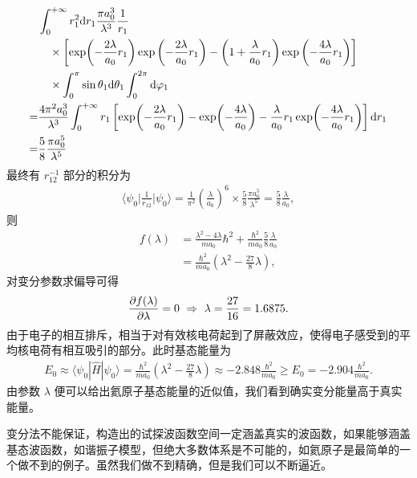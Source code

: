 \begin{align}
    &\int_0^{+\infty} r_1^2 \mathrm{d} r_1 \frac{\pi a_0^3}{\lambda^3} \frac1{r_1}  \notag \\ 
    &\quad\times\left[
        \exp\!\left(-\frac{2\lambda}{a_0}r_1\right)         \exp\left(-\frac{2\lambda}{a_0}r_1\right) - \left(1+\frac{\lambda}{a_0}r_1\right) \exp\left(-\frac{4\lambda}{a_0}r_1\right)
    \right] \notag \\
    &\quad \times \int_0^\pi \sin\theta_1 \mathrm{d}\theta_1
    \int_0^{2\pi} \mathrm{d}\varphi_1 \\
    =& \frac{4\pi^2 a_0^3}{\lambda^3} \int_0^{+\infty} r_1 
    \left[
        \exp\!\left(-\frac{2\lambda}{a_0} r_1\right) - \exp\!\left(-\frac{4\lambda}{a_0}\right) - 
        \frac{\lambda}{a_0} r_1 \exp\!\left(-\frac{4\lambda}{a_0} r_1\right)
    \right] \mathrm{d} r_1 \notag
    \\
    =& \frac58 \frac{\pi a_0^5}{\lambda^5}
\end{align}
最终有 $r_{12}^{-1}$ 部分的积分为
\begin{align}
    \bigg\langle \psi_0 \bigg| \frac1{r_{12}} \bigg| \psi_0 \bigg\rangle = \frac1{\pi^2}\left(\frac{\lambda}{a_0}\right)^6 \times \frac58 \frac{\pi a_0^5}{\lambda^5} = \frac58 \frac{\lambda}{a_0},
\end{align}
则
\begin{align}
    f(\lambda) &= \frac{\lambda^2 - 4\lambda}{ma_0}\hbar^2 + \frac{\hbar^2}{ma_0} \frac58 \frac{\lambda}{a_0} \\
    &= \frac{\hbar^2}{ma_0} \left(\lambda^2 - \frac{27}8 \lambda\right), 
\end{align}
对变分参数求偏导可得
\begin{align}
    \pdv{f(\lambda)}{\lambda} = 0 \ \Rightarrow \ \lambda = \frac{27}{16} = \num{1.6875}.
\end{align}
由于电子的相互排斥，相当于对有效核电荷起到了屏蔽效应，使得电子感受到的平均核电荷有相互吸引的部分。此时基态能量为
\begin{align}
    E_0 \approx \langle \psi_0|\hat H | \psi_0\rangle = \frac{\hbar^2}{ma_0} \left(\lambda^2 - \frac{27}8 \lambda\right) \approx \num{-2.848} \frac{\hbar^2}{ma_0} \geqslant E_0 = \num{-2.904} \frac{\hbar^2}{ma_0}. 
\end{align}
由参数 $\lambda$ 便可以给出氦原子基态能量的近似值，我们看到确实变分能量高于真实能量。

变分法不能保证，构造出的试探波函数空间一定涵盖真实的波函数，如果能够涵盖基态波函数，如谐振子模型，但绝大多数体系是不可能的，如氦原子是最简单的一个做不到的例子。虽然我们做不到精确，但是我们可以不断逼近。


